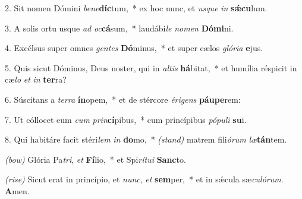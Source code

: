 2. Sit nomen Dómini \textit{be}\textit{ne}\-\textbf{díc}tum,~* ex hoc nunc, et \textit{us}\textit{que} \textit{in} \textbf{s\'{\ae}}\textbf{cu}lum.

3. A solis ortu usque \textit{ad} \textit{oc}\textbf{cá}sum,~* laudábi\textit{le} \textit{no}\textit{men} \textbf{Dó}\textbf{mi}ni.

4. Excélsus super omnes \textit{gen}\textit{tes} \textbf{Dó}minus,~* et super cælos \textit{gló}\textit{ri}\textit{a} \textbf{e}jus.

5. Quis sicut Dóminus, Deus noster, qui in \textit{al}\textit{tis} \textbf{há}bitat,~* et humília réspicit in cæ\textit{lo} \textit{et} \textit{in} \textbf{ter}ra?

6. Súscitans a \textit{ter}\textit{ra} \textbf{ín}opem,~* et de stércore \textit{é}\textit{ri}\textit{gens} \textbf{páu}\textbf{pe}rem:

7. Ut cóllocet eum \textit{cum} \textit{prin}\textbf{cí}pibus,~* cum princípibus \textit{pó}\textit{pu}\textit{li} \textbf{su}i.

8. Qui habitáre facit stéri\textit{lem} \textit{in} \textbf{do}mo,~* {\color{red}\textit{(stand)}} matrem fili\textit{ó}\textit{rum} \textit{læ}\textbf{tán}tem.

{\color{red}\textit{(bow)}} Glória Pa\textit{tri}, \textit{et} \textbf{Fí}lio,~* et Spi\textit{rí}\textit{tu}\textit{i} \textbf{Sanc}to.

{\color{red}\textit{(rise)}} Sicut erat in princípio, et \textit{nunc}, \textit{et} \textbf{sem}per,~* et in s\'{\ae}cula sæ\textit{cu}\textit{ló}\textit{rum}. \textbf{A}men.